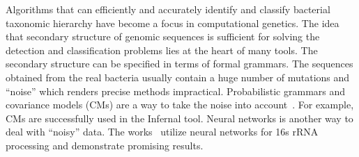 \documentclass[a0paper,portrait]{baposter}
\begin{document}
\begin{poster}
{Algorithms that can efficiently and accurately identify and classify bacterial taxonomic hierarchy have become a focus in computational genetics.
The idea that secondary structure of genomic sequences is sufficient for solving the detection and classification problems lies at the heart of many tools.%
The secondary structure can be specified in terms of formal grammars. 
The sequences obtained from the real bacteria usually contain a huge number of mutations and ``noise'' which renders precise methods impractical. 
Probabilistic grammars and covariance models (CMs) are a way to take the noise into account~\cite{EddyDurbin}.
For example, CMs are successfully used in the Infernal tool. %
Neural networks is another way to deal with ``noisy'' data. 
The works~\cite{Humidor, ANN} utilize neural networks for 16s rRNA processing and demonstrate promising results. 
\vspace{0.17cm}
}

    
\end{poster}
\end{document}
